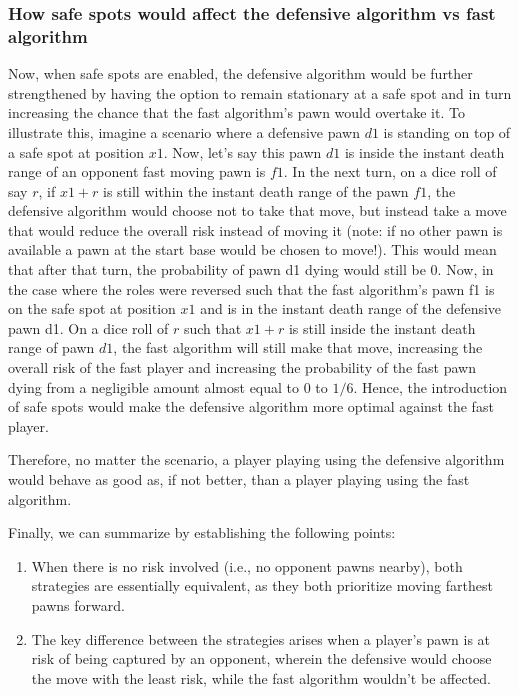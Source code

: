 \documentclass{article} %
\begin{document}
\subsubsection{How safe spots would affect the defensive algorithm vs fast algorithm}
Now, when safe spots are enabled, the defensive algorithm would be further strengthened by having the option to remain stationary at a safe spot and in turn increasing the chance that the fast algorithm’s pawn would overtake it. To illustrate this, imagine a scenario where a defensive pawn $d1$ is standing on top of a safe spot at position $x1$. Now, let's say this pawn $d1$ is inside the instant death range of an opponent fast moving pawn is $f1$. In the next turn, on a dice roll of say $r$, if $x1+r$ is still within the instant death range of the pawn $f1$, the defensive algorithm would choose not to take that move, but instead take a move that would reduce the overall risk instead of moving it (note: if no other pawn is available a pawn at the start base would be chosen to move!). This would mean that after that turn, the probability of pawn d1 dying would still be $0$. 
Now, in the case where the roles were reversed such that the fast algorithm’s pawn f1 is on the safe spot at position $x1$ and is in the instant death range of the defensive pawn d1. On a dice roll of $r$ such that $x1+r$ is still inside the instant death range of pawn $d1$, the fast algorithm will still make that move, increasing the overall risk of the fast player and increasing the probability of the fast pawn dying from a negligible amount almost equal to $0$ to $1/6$. 
Hence, the introduction of safe spots would make the defensive algorithm more optimal against the fast player.

Therefore, no matter the scenario, a player playing using the defensive algorithm would behave as good as, if not better, than a player playing using the fast algorithm.

Finally, we can summarize by establishing the following points:

\begin{enumerate}
    

\item When there is no risk involved (i.e., no opponent pawns nearby), both strategies are essentially equivalent, as they both prioritize moving farthest pawns forward.
\item The key difference between the strategies arises when a player's pawn is at risk of being captured by an opponent, wherein the defensive would choose the move with the least risk, while the fast algorithm wouldn’t be affected.
\end{enumerate}
\end{document}
